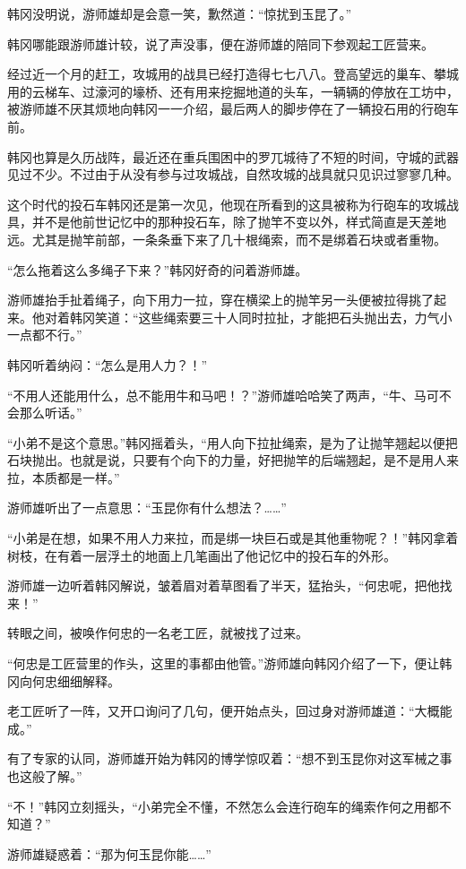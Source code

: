 韩冈没明说，游师雄却是会意一笑，歉然道：“惊扰到玉昆了。”

韩冈哪能跟游师雄计较，说了声没事，便在游师雄的陪同下参观起工匠营来。

经过近一个月的赶工，攻城用的战具已经打造得七七八八。登高望远的巢车、攀城用的云梯车、过濠河的壕桥、还有用来挖掘地道的头车，一辆辆的停放在工坊中，被游师雄不厌其烦地向韩冈一一介绍，最后两人的脚步停在了一辆投石用的行砲车前。

韩冈也算是久历战阵，最近还在重兵围困中的罗兀城待了不短的时间，守城的武器见过不少。不过由于从没有参与过攻城战，自然攻城的战具就只见识过寥寥几种。

这个时代的投石车韩冈还是第一次见，他现在所看到的这具被称为行砲车的攻城战具，并不是他前世记忆中的那种投石车，除了抛竿不变以外，样式简直是天差地远。尤其是抛竿前部，一条条垂下来了几十根绳索，而不是绑着石块或者重物。

“怎么拖着这么多绳子下来？”韩冈好奇的问着游师雄。

游师雄抬手扯着绳子，向下用力一拉，穿在横梁上的抛竿另一头便被拉得挑了起来。他对着韩冈笑道：“这些绳索要三十人同时拉扯，才能把石头抛出去，力气小一点都不行。”

韩冈听着纳闷：“怎么是用人力？！”

“不用人还能用什么，总不能用牛和马吧！？”游师雄哈哈笑了两声，“牛、马可不会那么听话。”

“小弟不是这个意思。”韩冈摇着头，“用人向下拉扯绳索，是为了让抛竿翘起以便把石块抛出。也就是说，只要有个向下的力量，好把抛竿的后端翘起，是不是用人来拉，本质都是一样。”

游师雄听出了一点意思：“玉昆你有什么想法？……”

“小弟是在想，如果不用人力来拉，而是绑一块巨石或是其他重物呢？！”韩冈拿着树枝，在有着一层浮土的地面上几笔画出了他记忆中的投石车的外形。

游师雄一边听着韩冈解说，皱着眉对着草图看了半天，猛抬头，“何忠呢，把他找来！”

转眼之间，被唤作何忠的一名老工匠，就被找了过来。

“何忠是工匠营里的作头，这里的事都由他管。”游师雄向韩冈介绍了一下，便让韩冈向何忠细细解释。

老工匠听了一阵，又开口询问了几句，便开始点头，回过身对游师雄道：“大概能成。”

有了专家的认同，游师雄开始为韩冈的博学惊叹着：“想不到玉昆你对这军械之事也这般了解。”

“不！”韩冈立刻摇头，“小弟完全不懂，不然怎么会连行砲车的绳索作何之用都不知道？”

游师雄疑惑着：“那为何玉昆你能……”

